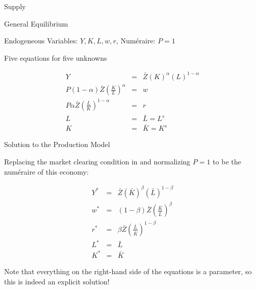 \documentclass[notes,11pt, aspectratio=169, xcolor=table]{beamer}
\begin{document}
\begin{frame}{Supply}
\begin{figure}[htbp!]
\begin{subfigure}{}
{
}

\end{subfigure}

\end{figure}
\end{frame}


\begin{frame}{General Equilibrium}

\Large{Endogeneous Variables: $Y, K, L, w, r$, \quad Num\'eraire: $P=1$}

\vspace{20pt}

\normalsize Five equations for five unknowns

  \begin{eqnarray}
    Y &=& \bar{Z} (K)^{\alpha} (L)^{1-\alpha} \\
    P (1-\alpha) \bar{Z} \left( \frac{K}{L} \right)^\alpha  &=& w \\
    P \alpha \bar{Z} \left( \frac{L}{K} \right)^{1-\alpha}  &=& r  \\
     L &=& \bar{L} = L^s  \\
     K &=& \bar{K} = K^s
  \end{eqnarray}

\end{frame}

\begin{frame}{Solution to the Production Model}

Replacing the market clearing condition in and normalizing $P=1$ to be the num\'eraire of this economy:

  \begin{eqnarray}
    Y^* &=& \bar{Z} (\bar{K})^{\beta} (\bar{L})^{1-\beta} \\
    w^* &=& (1-\beta) \bar{Z} \left( \frac{\bar{K}}{\bar{L}} \right)^\beta  \\
     r^* &=&  \beta \bar{Z} \left( \frac{\bar{L}}{\bar{K}} \right)^{1-\beta}  \\
     L^* &=& \bar{L}  \\
     K^* &=& \bar{K}
  \end{eqnarray}

Note that everything on the right-hand side of the equations is a parameter, so this is indeed an explicit solution!
\end{frame}
\end{document}
